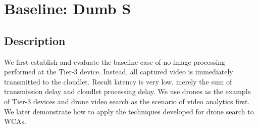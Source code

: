 \section{Baseline: {\xc Dumb}  S}
\label{sec:dumbdrone}

\subsection{Description}

We first establish and evaluate the baseline case of no image processing
performed at the Tier-3 device.  Instead, all captured video is immediately
transmitted to the cloudlet.  Result latency is very low, merely the sum of
transmission delay and cloudlet processing delay. We use drones as the example
of Tier-3 devices and drone video search as the scenario of video analytics
first. We later demonstrate how to apply the techniques developed for drone
search to WCAs.

